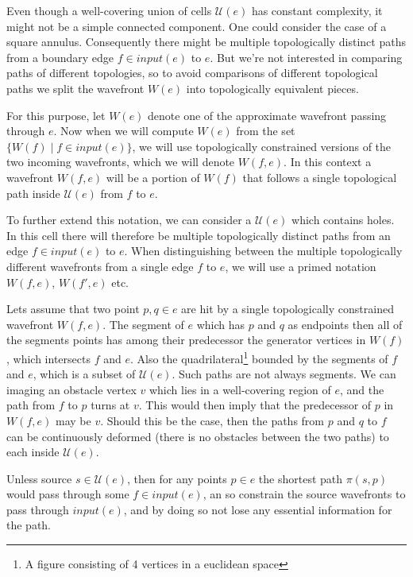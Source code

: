 Even though a well-covering union of cells $\mathcal{U}(e)$ has constant complexity, it might not be 
a simple connected component. One could consider the case of a square annulus. Consequently 
there might be multiple topologically distinct paths from a boundary edge $f \in input(e)$ 
to $e$. But we're not interested in comparing paths of different topologies, so to avoid 
comparisons of different topological paths we split the wavefront $W(e)$ into topologically 
equivalent pieces. 

For this purpose, let $W(e)$ denote one of the approximate wavefront passing through $e$. Now 
when we will compute $W(e)$ from the set $\{W(f) \mid f \in input(e)\}$, we will use topologically 
constrained versions of the two incoming wavefronts, which we will denote $W(f,e)$. In this 
context a wavefront $W(f,e)$ will be a portion of $W(f)$ that follows a single topological 
path inside $\mathcal{U}(e)$ from $f$ to $e$.

To further extend this notation, we can consider a $\mathcal{U}(e)$ which contains holes. 
In this cell there will therefore be multiple topologically distinct paths from an edge $f 
\in input(e)$ to $e$. When distinguishing between the multiple topologically different 
wavefronts from a single edge $f$ to $e$, we will use a primed notation $W(f,e)$, $W(f',e)$ 
etc.

Lets assume that two point $p, q \in e$ are hit by a single topologically constrained 
wavefront $W(f,e)$. The segment of $e$ which has $p$ and $q$ as endpoints then all of the 
segments points has among their predecessor the generator vertices in $W(f)$, which 
intersects $f$ and $e$. Also the quadrilateral\footnote{A figure consisting of 4 vertices in a euclidean space} 
bounded by the segments of $f$ and $e$, which 
is a subset of $\mathcal{U}(e)$. Such paths are not always segments. We can imaging an 
obstacle vertex $v$ which lies in a well-covering region of $e$, and the path from $f$ to $p$ 
turns at $v$. This would then imply that the predecessor of $p$ in $W(f,e)$ may be $v$. 
Should this be the case, then the paths from $p$ and $q$ to $f$ can be continuously deformed 
(there is no obstacles between the two paths) to each inside $\mathcal{U}(e)$. 

Unless source $s \in \mathcal{U}(e)$, then for any points $p \in e$ the shortest path $\pi(s,p)$ 
would pass through some $f \in input(e)$, an so constrain the source wavefronts to pass 
through $input(e)$, and by doing so not lose any essential information for the path.

